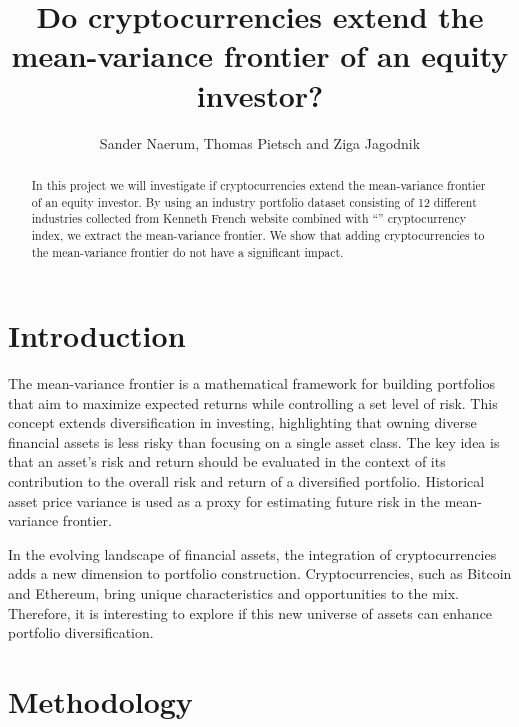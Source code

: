 \documentclass[12pt,a4paper]{article}
\title{Do cryptocurrencies extend the mean-variance frontier of an equity investor?}
\author{Sander Naerum, Thomas Pietsch and Ziga Jagodnik}
\begin{document}
\maketitle

\begin{abstract}
In this project we will investigate if cryptocurrencies extend the mean-variance frontier of an equity investor. 
By using an industry portfolio dataset consisting of 12 different industries collected from Kenneth French website 
combined with “” cryptocurrency index, we extract the mean-variance frontier. We show that adding cryptocurrencies to 
the mean-variance frontier do not have a significant impact.  
\end{abstract}

\section{Introduction}\label{sec:intro}
The mean-variance frontier is a mathematical framework for building portfolios that aim to maximize expected returns 
while controlling a set level of risk. This concept extends diversification in investing, highlighting that owning 
diverse financial assets is less risky than focusing on a single asset class. The key idea is that an asset's risk and 
return should be evaluated in the context of its contribution to the overall risk and return of a diversified portfolio. 
Historical asset price variance is used as a proxy for estimating future risk in the mean-variance frontier.

In the evolving landscape of financial assets, the integration of cryptocurrencies adds a new dimension to portfolio 
construction. Cryptocurrencies, such as Bitcoin and Ethereum, bring unique characteristics and opportunities to the mix. 
Therefore, it is interesting to explore if this new universe of assets can enhance portfolio diversification. 

\section{Methodology}\label{sec:methods}
\end{document}
